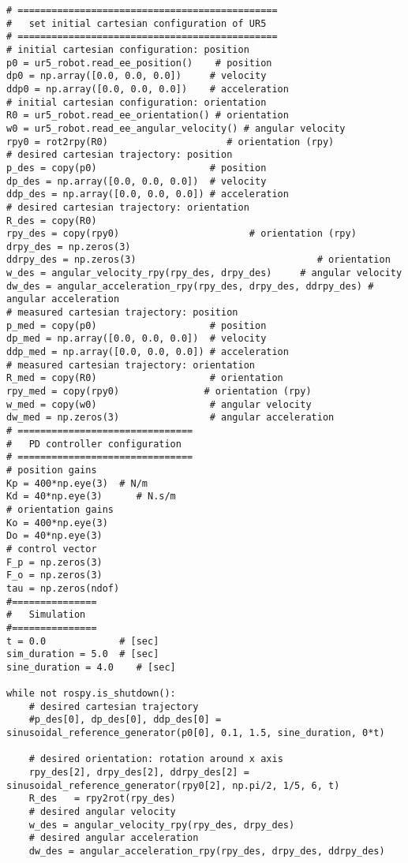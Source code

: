\begin{lstlisting}
# ==============================================
#   set initial cartesian configuration of UR5
# ==============================================
# initial cartesian configuration: position
p0 = ur5_robot.read_ee_position()    # position
dp0 = np.array([0.0, 0.0, 0.0])     # velocity
ddp0 = np.array([0.0, 0.0, 0.0])    # acceleration
# initial cartesian configuration: orientation
R0 = ur5_robot.read_ee_orientation() # orientation
w0 = ur5_robot.read_ee_angular_velocity() # angular velocity
rpy0 = rot2rpy(R0)                     # orientation (rpy)
# desired cartesian trajectory: position
p_des = copy(p0)                    # position
dp_des = np.array([0.0, 0.0, 0.0])  # velocity
ddp_des = np.array([0.0, 0.0, 0.0]) # acceleration
# desired cartesian trajectory: orientation
R_des = copy(R0)
rpy_des = copy(rpy0)                       # orientation (rpy)
drpy_des = np.zeros(3)
ddrpy_des = np.zeros(3)                                # orientation
w_des = angular_velocity_rpy(rpy_des, drpy_des)     # angular velocity
dw_des = angular_acceleration_rpy(rpy_des, drpy_des, ddrpy_des) # angular acceleration
# measured cartesian trajectory: position
p_med = copy(p0)                    # position
dp_med = np.array([0.0, 0.0, 0.0])  # velocity
ddp_med = np.array([0.0, 0.0, 0.0]) # acceleration
# measured cartesian trajectory: orientation
R_med = copy(R0)                    # orientation
rpy_med = copy(rpy0)               # orientation (rpy)
w_med = copy(w0)                    # angular velocity
dw_med = np.zeros(3)                # angular acceleration
# ===============================
#   PD controller configuration
# ===============================
# position gains
Kp = 400*np.eye(3)  # N/m
Kd = 40*np.eye(3)      # N.s/m
# orientation gains
Ko = 400*np.eye(3)   
Do = 40*np.eye(3)
# control vector
F_p = np.zeros(3)    
F_o = np.zeros(3)
tau = np.zeros(ndof)
#===============
#   Simulation
#===============
t = 0.0             # [sec] 
sim_duration = 5.0  # [sec]
sine_duration = 4.0    # [sec]

while not rospy.is_shutdown():
    # desired cartesian trajectory
    #p_des[0], dp_des[0], ddp_des[0] = sinusoidal_reference_generator(p0[0], 0.1, 1.5, sine_duration, 0*t)
    
    # desired orientation: rotation around x axis
    rpy_des[2], drpy_des[2], ddrpy_des[2] = sinusoidal_reference_generator(rpy0[2], np.pi/2, 1/5, 6, t)     
    R_des   = rpy2rot(rpy_des)
    # desired angular velocity
    w_des = angular_velocity_rpy(rpy_des, drpy_des)
    # desired angular acceleration
    dw_des = angular_acceleration_rpy(rpy_des, drpy_des, ddrpy_des)
    

\end{lstlisting}
